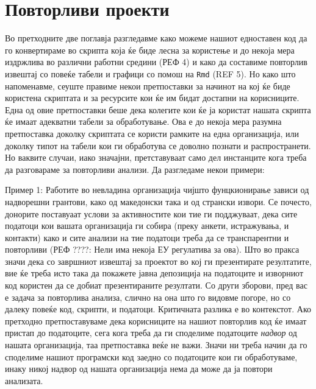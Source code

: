 \documentclass[
]{book}
\begin{document}
\hypertarget{ux43fux43eux432ux442ux43eux440ux43bux438ux432ux438-ux43fux440ux43eux435ux43aux442ux438}{%
\chapter{Повторливи проекти}\label{ux43fux43eux432ux442ux43eux440ux43bux438ux432ux438-ux43fux440ux43eux435ux43aux442ux438}}

Во претходните две поглавја разгледавме како можеме нашиот едноставен код да го конвертираме во скрипта која ќе биде лесна за користење и до некоја мера издржлива во различни работни средини (РЕФ 4) и како да составиме повторлив извештај со повеќе табели и графици со помош на \texttt{Rmd} (REF 5). Но како што напоменавме, сеуште правиме некои претпоставки за начинот на кој ќе биде користена скриптата и за ресурсите кои ќе им бидат достапни на корисниците. Една од овие претпоставки беше дека колегите кои ќе ја користат нашата скрипта ќе имаат адекватни табели за обработување. Ова е до некоја мера разумна претпоставка доколку скриптата се користи рамките на една организација, или доколку типот на табели кои ги обработува се доволно познати и распространети. Но ваквите случаи, иако значајни, претставуваат само дел инстанците кога треба да разговараме за повторливи анализи. Да разгледаме некои примери:

Пример 1: Работите во невладина организација чијшто фунцкионирање зависи од надворешни грантови, како од македонски така и од странски извори. Се почесто, донорите поставуаат услови за активностите кои тие ги подджуваат, дека сите податоци кои вашата организација ги собира (преку анкети, истражувања, и контакти) како и сите анализи на тие податоци треба да се транспарентни и повторливи (РЕФ ????: Нели има некоја ЕУ регулатива за ова). Што во пракса значи дека со завршниот извештај за проектот во кој ги презентирате резултатите, вие ќе треба исто така да покажете јавна депозиција на податоците и изворниот код користен да се добиат презентираните резултати. Со други зборови, пред вас е задача за повторлива анализа, слично на она што го видовме погоре, но со далеку повеќе код, скрипти, и податоци. Критичната разлика е во контекстот. Ако претходно претпоставуваме дека корисниците на нашиот повторлив код ќе имаат пристап до податоците, сега кога треба да ги споделиме податоците \emph{надвор} од нашата организација, таа претпоставка веќе не важи. Значи ни треба начин да го споделиме нашиот програмски код заедно со податоците кои ги обработуваме, инаку никој надвор од нашата организација нема да може да ја повтори анализата.
\end{document}

